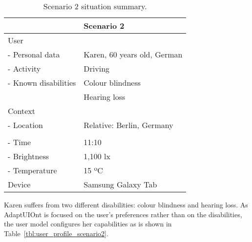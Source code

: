 \begin{table}
 \caption{Scenario 2 situation summary.}
 \label{tbl:scenario2}
 \footnotesize
 \centering
\begin{tabular}{l l}
  \hline 
				& \textbf{Scenario 2}		\\
  \hline
  User \\
  \qquad - Personal data 	& Karen, 60 years old, German \\
  \qquad - Activity	 	& Driving 			\\
  \qquad - Known disabilities 	& Colour blindness 		\\
				& Hearing loss 			\\
  Context \\
  \qquad - Location 		& Relative: Berlin, Germany  	\\
				& 				\\
  \qquad - Time			& 11:10 			\\
  \qquad - Brightness		& 1,100 \ac{lx} 		\\
  \qquad - Temperature		& 15 ºC 			\\
  Device 			& Samsung Galaxy Tab 	 	\\
  \hline
\end{tabular}
\end{table}

Karen suffers from two different disabilities: colour blindness and hearing 
loss. As AdaptUIOnt is focused on the user’s preferences rather than on the 
disabilities, the user model configures her capabilities as is shown in 
Table~\ref{tbl:user_profile_scenario2}. 

